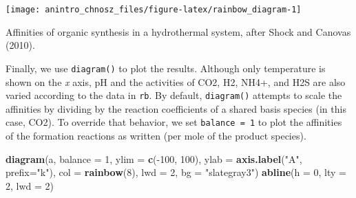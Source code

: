 \documentclass[]{tufte-handout}
\newenvironment{Shaded}{}{}
\newcommand{\KeywordTok}[1]{\textcolor[rgb]{0.00,0.44,0.13}{\textbf{#1}}}
\newcommand{\DataTypeTok}[1]{\textcolor[rgb]{0.56,0.13,0.00}{#1}}
\newcommand{\DecValTok}[1]{\textcolor[rgb]{0.25,0.63,0.44}{#1}}
\newcommand{\FloatTok}[1]{\textcolor[rgb]{0.25,0.63,0.44}{#1}}
\newcommand{\StringTok}[1]{\textcolor[rgb]{0.25,0.44,0.63}{#1}}
\newcommand{\OperatorTok}[1]{\textcolor[rgb]{0.40,0.40,0.40}{#1}}
\newcommand{\NormalTok}[1]{#1}
\begin{document}
\begin{Shaded}
\end{Shaded}

\begin{marginfigure}
\texttt{[image: anintro\_chnosz\_files/figure-latex/rainbow\_diagram-1]} \caption[Affinities of organic synthesis in a hydrothermal system, after Shock and Canovas (2010)]{Affinities of organic synthesis in a hydrothermal system, after Shock and Canovas (2010).}\label{fig:rainbow_diagram}
\end{marginfigure}

Finally, we use {\texttt{diagram()}} to plot the results. Although only
temperature is shown on the \emph{x} axis, pH and the activities of CO2,
H2, NH4+, and H2S are also varied according to the data in \texttt{rb}.
By default, {\texttt{diagram()}} attempts to scale the affinities by
dividing by the reaction coefficients of a shared basis species (in this
case, CO2). To override that behavior, we set \texttt{balance\ =\ 1} to
plot the affinities of the formation reactions as written (per mole of
the product species).

\begin{Shaded}
\begin{Highlighting}[]
\KeywordTok{diagram}\NormalTok{(a, }\DataTypeTok{balance =} \DecValTok{1}\NormalTok{, }\DataTypeTok{ylim =} \KeywordTok{c}\NormalTok{(}\OperatorTok{-}\DecValTok{100}\NormalTok{, }\DecValTok{100}\NormalTok{), }\DataTypeTok{ylab =} \KeywordTok{axis.label}\NormalTok{(}\StringTok{"A"}\NormalTok{, }\DataTypeTok{prefix=}\StringTok{"k"}\NormalTok{),}
        \DataTypeTok{col =} \KeywordTok{rainbow}\NormalTok{(}\DecValTok{8}\NormalTok{), }\DataTypeTok{lwd =} \DecValTok{2}\NormalTok{, }\DataTypeTok{bg =} \StringTok{"slategray3"}\NormalTok{)}
\KeywordTok{abline}\NormalTok{(}\DataTypeTok{h =} \DecValTok{0}\NormalTok{, }\DataTypeTok{lty =} \DecValTok{2}\NormalTok{, }\DataTypeTok{lwd =} \DecValTok{2}\NormalTok{)}
\end{Highlighting}
\end{Shaded}
\end{document}
